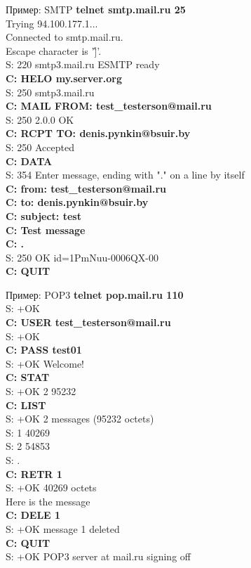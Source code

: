 \begin{frame}{Пример: SMTP}
\scriptsize
	{\bfseries telnet smtp.mail.ru 25}\\
	\color{gray}
	Trying 94.100.177.1...\\
	Connected to smtp.mail.ru.\\
	Escape character is '\^]'.\\
	\color{black}
	S: 220 smtp3.mail.ru ESMTP ready\\
	{\bfseries C: HELO my.server.org}\\
	S: 250 smtp3.mail.ru\\
	{\bfseries C: MAIL FROM: test\_testerson@mail.ru}\\
	S: 250 2.0.0 OK\\
	{\bfseries C: RCPT TO: denis.pynkin@bsuir.by}\\
	S: 250 Accepted\\
	{\bfseries C: DATA}\\
	S: 354 Enter message,  ending with "." on a line by itself\\
	{\bfseries C: from: test\_testerson@mail.ru\\
	C: to: denis.pynkin@bsuir.by\\
	C: subject: test\\
	C: Test message\\
	C: .}\\
	S: 250 OK id=1PmNuu-0006QX-00\\
	{\bfseries C: QUIT}
\normalsize
\end{frame}



\begin{frame}[fragile]{Пример: POP3}
\scriptsize
	{\bfseries telnet pop.mail.ru 110}\\
	S: +OK\\
	{\bfseries C: USER test\_testerson@mail.ru}\\
	S: +OK\\
	{\bfseries C: PASS test01}\\
	S: +OK Welcome!\\
	{\bfseries C: STAT}\\
	S: +OK 2 95232\\
	{\bfseries C: LIST}\\
	S: +OK 2 messages (95232 octets)\\
	S: 1 40269\\
	S: 2 54853\\
	S: .\\
	{\bfseries C: RETR 1}\\
	S: +OK 40269 octets\\
	{\color{gray}  Here is the message}\\
	{\bfseries C: DELE 1}\\
	S: +OK message 1 deleted\\
	{\bfseries C: QUIT}\\
	S: +OK POP3 server at mail.ru signing off\\
\normalsize
\end{frame}


